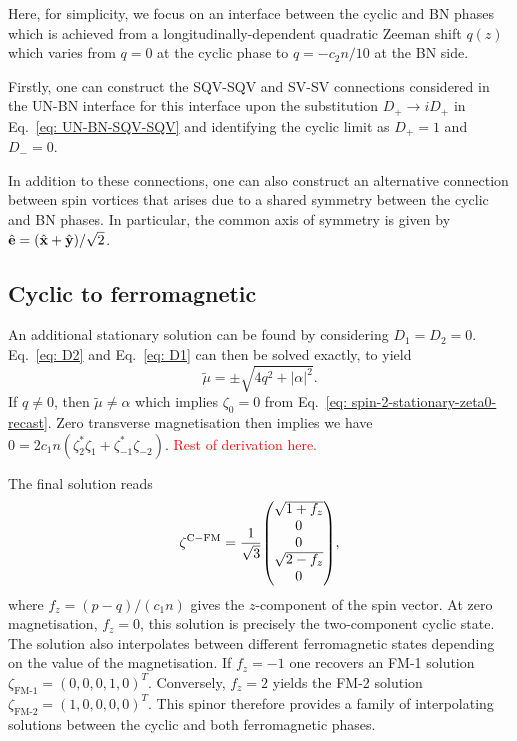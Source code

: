 Here, for simplicity, we focus on an interface between the cyclic and BN phases
which is achieved from a longitudinally-dependent quadratic Zeeman shift
\(q(z)\) which varies from \(q = 0\) at the cyclic phase to \(q = -c_2n/10\)
at the BN side.

Firstly, one can construct the SQV-SQV and SV-SV connections considered in the
UN-BN interface for this interface upon the substitution
\(D_+ \rightarrow iD_+\) in Eq.~\eqref{eq: UN-BN-SQV-SQV} and identifying the
cyclic limit as \(D_+ = 1\) and \(D_- = 0\).

In addition to these connections, one can also construct an alternative
connection between spin vortices that arises due to a shared symmetry between
the cyclic and BN phases.
In particular, the common axis of symmetry is given by \(\hat{\vb{e}} =
(\hat{\vb{x}} + \hat{\vb{y}}) / \sqrt{2}\).

\subsection{Cyclic to ferromagnetic}
An additional stationary solution can be found by considering \(D_1=D_2=0\).
Eq.~\eqref{eq: D2} and Eq.~\eqref{eq: D1} can then be solved exactly, to yield
\begin{equation}
    \tilde{\mu} = \pm \sqrt{4q^2 + |\alpha|^2}.
\end{equation}
If \(q \neq 0\), then \(\tilde{\mu} \neq \alpha \) which implies \(\zeta_0=0\)
from Eq.~\eqref{eq: spin-2-stationary-zeta0-recast}.
Zero transverse magnetisation then implies we have
\(0 = 2c_1n(\zeta_2^*\zeta_{1} + \zeta_{-1}^*\zeta_{-2})\).
\textcolor{red}{Rest of derivation here.}

The final solution reads
\begin{equation}\label{eq: C-FM-interpolating-spinor}
    \zeta^\mathrm{C-FM} = \frac{1}{\sqrt{3}}\mqty(
    \sqrt{1 + f_z} \\
    0 \\
    0 \\
    \sqrt{2 - f_z} \\
    0
    ),
\end{equation}
where \(f_z = (p - q) / (c_1n)\) gives the \(z\)-component of the spin vector.
At zero magnetisation, \(f_z = 0\), this solution is precisely the two-component
cyclic state.
The solution also interpolates between different ferromagnetic states depending
on the value of the magnetisation.
If \(f_z = -1\) one recovers an FM-1 solution
\(\zeta_\text{FM-1} = {(0, 0, 0, 1, 0)}^T\).
Conversely, \(f_z = 2\) yields the FM-2 solution
\(\zeta_\text{FM-2} = {(1, 0, 0, 0, 0)}^T\).
This spinor therefore provides a family of interpolating solutions between the
cyclic and both ferromagnetic phases.

